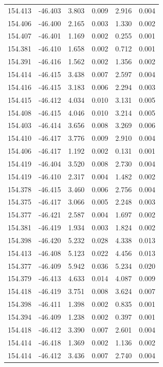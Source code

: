 \documentclass[11pt]{article}
\begin{document}
\begin{table}
\begin{minipage}{0.48\paperwidth}
\begin{tabular}{cccccc}
154.413 & -46.403 & 3.803 & 0.009 & 2.916 & 0.004 \\
154.406 & -46.400 & 2.165 & 0.003 & 1.330 & 0.002 \\
154.407 & -46.401 & 1.169 & 0.002 & 0.255 & 0.001 \\
154.381 & -46.410 & 1.658 & 0.002 & 0.712 & 0.001 \\
154.391 & -46.416 & 1.562 & 0.002 & 1.356 & 0.002 \\
154.414 & -46.415 & 3.438 & 0.007 & 2.597 & 0.004 \\
154.416 & -46.415 & 3.183 & 0.006 & 2.294 & 0.003 \\
154.415 & -46.412 & 4.034 & 0.010 & 3.131 & 0.005 \\
154.408 & -46.415 & 4.046 & 0.010 & 3.214 & 0.005 \\
154.403 & -46.414 & 3.656 & 0.008 & 3.269 & 0.006 \\
154.410 & -46.417 & 3.776 & 0.009 & 2.910 & 0.004 \\
154.406 & -46.417 & 1.192 & 0.002 & 0.131 & 0.001 \\
154.419 & -46.404 & 3.520 & 0.008 & 2.730 & 0.004 \\
154.419 & -46.410 & 2.317 & 0.004 & 1.482 & 0.002 \\
154.378 & -46.415 & 3.460 & 0.006 & 2.756 & 0.004 \\
154.375 & -46.417 & 3.066 & 0.005 & 2.248 & 0.003 \\
154.377 & -46.421 & 2.587 & 0.004 & 1.697 & 0.002 \\
154.381 & -46.419 & 1.934 & 0.003 & 1.824 & 0.002 \\
154.398 & -46.420 & 5.232 & 0.028 & 4.338 & 0.013 \\
154.413 & -46.408 & 5.123 & 0.022 & 4.456 & 0.013 \\
154.377 & -46.409 & 5.942 & 0.036 & 5.234 & 0.020 \\
154.379 & -46.413 & 4.633 & 0.014 & 4.087 & 0.009 \\
154.418 & -46.419 & 3.751 & 0.008 & 3.624 & 0.007 \\
154.398 & -46.411 & 1.398 & 0.002 & 0.835 & 0.001 \\
154.394 & -46.409 & 1.238 & 0.002 & 0.397 & 0.001 \\
154.418 & -46.412 & 3.390 & 0.007 & 2.601 & 0.004 \\
154.414 & -46.418 & 1.369 & 0.002 & 1.136 & 0.002 \\
154.414 & -46.412 & 3.436 & 0.007 & 2.740 & 0.004 \\

\end{tabular}
\end{minipage}
\end{table}
\end{document}
